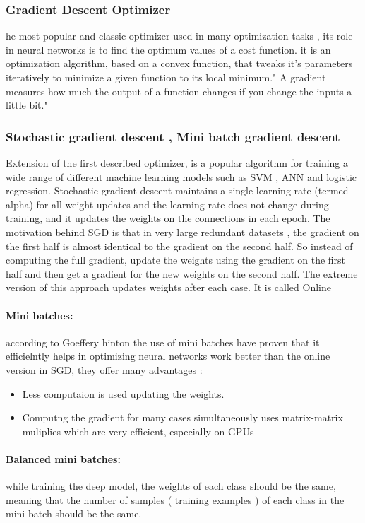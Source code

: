 \subsubsection{Gradient Descent Optimizer}
he most popular and classic optimizer used in many optimization tasks , its role in
neural networks is to find the optimum values of a cost function. it is an optimization
algorithm, based on a convex function, that tweaks it’s parameters iteratively to minimize
a given function to its local minimum." A gradient measures how much the output of a
function changes if you change the inputs a little bit."\cite{art20}
\subsubsection{Stochastic gradient descent , Mini batch gradient descent}
Extension of the first described optimizer, is a popular algorithm for training a wide
range of different machine learning models such as SVM , ANN and logistic regression. Stochastic gradient descent maintains a single learning rate (termed alpha) for all
weight updates and the learning rate does not change during training, and it updates
the weights on the connections in each epoch. The motivation behind SGD is that in
very large redundant datasets , the gradient on the first half is almost identical to the
gradient on the second half. So instead of computing the full gradient, update the weights
using the gradient on the first half and then get a gradient for the new weights on the
second half. The extreme version of this approach updates weights after each case. It is
called Online\cite{c1}
\paragraph{Mini batches:}according to Goeffery hinton \cite{c1} the use of mini batches have proven
that it efficielntly helps in optimizing neural networks work better than the online
version in SGD, they offer many advantages :
\begin{itemize}
    \item Less computaion is used updating the weights.
    \item Computng the gradient for many cases simultaneously uses matrix-matrix muliplies
which are very efficient, especially on GPUs
\end{itemize}
\paragraph{Balanced mini batches:} while training the deep model, the weights of each class
should be the same, meaning that the number of samples ( training examples ) of each
class in the mini-batch should be the same.
